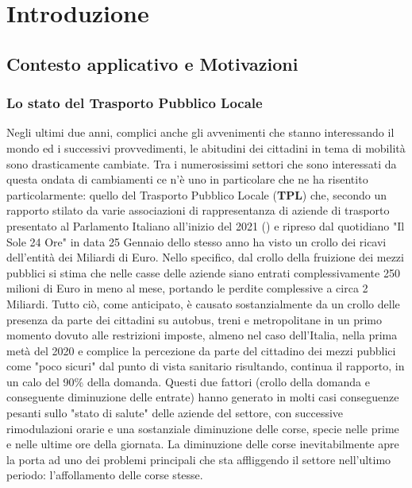 \chapter{Introduzione}

\section{Contesto applicativo e Motivazioni} %
    \subsection{Lo stato del Trasporto Pubblico Locale}
    Negli ultimi due anni, complici anche gli avvenimenti che stanno interessando il mondo ed i successivi provvedimenti, le abitudini dei cittadini in tema di mobilità sono drasticamente cambiate.
    Tra i numerosissimi settori che sono interessati da questa ondata di cambiamenti ce n'è uno in particolare che ne ha risentito particolarmente: quello del Trasporto Pubblico Locale (\textbf{TPL}) che, secondo un rapporto stilato da varie associazioni di rappresentanza di aziende di trasporto presentato al Parlamento Italiano all'inizio del 2021 (\cite{statotpl}) e ripreso dal quotidiano "Il Sole 24 Ore" in data 25 Gennaio dello stesso anno \cite{statotplsole24ore} ha visto un crollo dei ricavi dell'entità dei Miliardi di Euro. Nello specifico, dal crollo della fruizione dei mezzi pubblici si stima che nelle casse delle aziende siano entrati complessivamente 250 milioni di Euro in meno al mese, portando le perdite complessive a circa 2 Miliardi.
    Tutto ciò, come anticipato, è causato sostanzialmente da un crollo delle presenza da parte dei cittadini su autobus, treni e metropolitane in un primo momento dovuto alle restrizioni imposte, almeno nel caso dell'Italia, nella prima metà del 2020 e complice la percezione da parte del cittadino dei mezzi pubblici come "poco sicuri" dal punto di vista sanitario risultando, continua il rapporto, in un calo del 90\% della domanda.
    Questi due fattori (crollo della domanda e conseguente diminuzione delle entrate) hanno generato in molti casi conseguenze pesanti sullo "stato di salute" delle aziende del settore, con successive rimodulazioni orarie e una sostanziale diminuzione delle corse, specie nelle prime e nelle ultime ore della giornata. La diminuzione delle corse inevitabilmente apre la porta ad uno dei problemi principali che sta affliggendo il settore nell'ultimo periodo: l'affollamento delle corse stesse.
    

